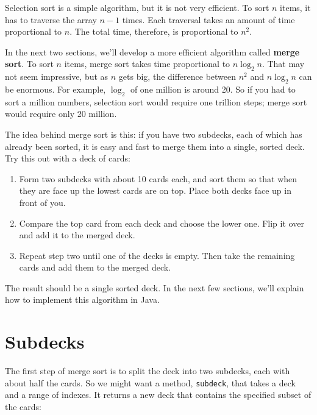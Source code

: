 \documentclass[12pt]{book}
\theoremstyle{exercise}
\newcommand{\java}[1]{\verb"#1"}
\begin{document}

Selection sort is a simple algorithm, but it is not very efficient.
To sort $n$ items, it has to traverse the array $n-1$ times.
Each traversal takes an amount of time proportional to $n$.
The total time, therefore, is proportional to $n^2$.

In the next two sections, we'll develop a more efficient algorithm called {\bf merge sort}.
To sort $n$ items, merge sort takes time proportional to $n \log_2 n$.
That may not seem impressive, but as $n$ gets big, the difference between $n^2$ and $n \log_2 n$ can be enormous.
For example, $\log_2$ of one million is around 20.
So if you had to sort a million numbers, selection sort would require one trillion steps; merge sort would require only 20 million.

The idea behind merge sort is this: if you have two subdecks, each of which has already been sorted, it is easy and fast to merge them into a single, sorted deck.
Try this out with a deck of cards:

\begin{enumerate}

\item Form two subdecks with about 10 cards each, and sort them so that when they are face up the lowest cards are on top.
Place both decks face up in front of you.

\item Compare the top card from each deck and choose the lower one.
Flip it over and add it to the merged deck.

\item Repeat step two until one of the decks is empty.
Then take the remaining cards and add them to the merged deck.

\end{enumerate}

The result should be a single sorted deck.
In the next few sections, we'll explain how to implement this algorithm in Java.


\section{Subdecks}

The first step of merge sort is to split the deck into two subdecks, each with about half the cards.
So we might want a method, \java{subdeck}, that takes a deck and a range of indexes.
It returns a new deck that contains the specified subset of the cards:
\end{document}
